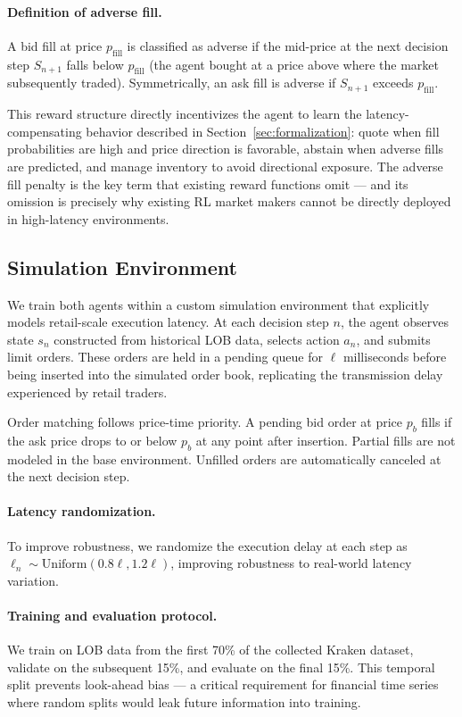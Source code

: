 \documentclass[12pt]{article}
\begin{document}
\paragraph{Definition of adverse fill.} A bid fill at price $p_{\mathrm{fill}}$ is classified as adverse if the mid-price at the next decision step $S_{n+1}$ falls below $p_{\mathrm{fill}}$ (the agent bought at a price above where the market subsequently traded). Symmetrically, an ask fill is adverse if $S_{n+1}$ exceeds $p_{\mathrm{fill}}$.

This reward structure directly incentivizes the agent to learn the latency-compensating behavior described in Section~\ref{sec:formalization}: quote when fill probabilities are high and price direction is favorable, abstain when adverse fills are predicted, and manage inventory to avoid directional exposure. The adverse fill penalty is the key term that existing reward functions omit --- and its omission is precisely why existing RL market makers cannot be directly deployed in high-latency environments.

\subsection{Simulation Environment}

We train both agents within a custom simulation environment that explicitly models retail-scale execution latency. At each decision step $n$, the agent observes state $s_n$ constructed from historical LOB data, selects action $a_n$, and submits limit orders. These orders are held in a pending queue for $\ell$ milliseconds before being inserted into the simulated order book, replicating the transmission delay experienced by retail traders.

Order matching follows price-time priority. A pending bid order at price $p_b$ fills if the ask price drops to or below $p_b$ at any point after insertion. Partial fills are not modeled in the base environment. Unfilled orders are automatically canceled at the next decision step.

\paragraph{Latency randomization.} To improve robustness, we randomize the execution delay at each step as $\ell_n \sim \mathrm{Uniform}(0.8\ell, 1.2\ell)$, improving robustness to real-world latency variation.

\paragraph{Training and evaluation protocol.} We train on LOB data from the first 70\% of the collected Kraken dataset, validate on the subsequent 15\%, and evaluate on the final 15\%. This temporal split prevents look-ahead bias --- a critical requirement for financial time series where random splits would leak future information into training.
\end{document}
